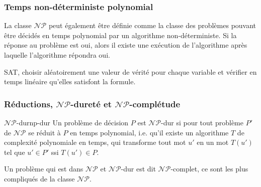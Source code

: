 \subsubsection{Temps non-déterministe polynomial}
\label{sub:temps_non_deterministe_polynomial}
La classe $\mathcal{NP}$ peut également être définie comme la classe des problèmes pouvant être décidés en temps polynomial
par un algorithme non-déterministe. Si la réponse au problème est oui, alors il existe une exécution de l'algorithme après 
laquelle l'algorithme répondra oui.
\begin{example}
    SAT, choisir aléatoirement une valeur de vérité pour chaque variable et vérifier en temps linéaire qu'elles satisfont
    la formule.
\end{example}

\subsubsection{Réductions, $\mathcal{NP}$-dureté et $\mathcal{NP}$-complétude}
\label{sub:reductions_np_durete_et_np_completude}
\begin{definition}{$\mathcal{NP}$-dur}{np-dur}
    Un problème de décision $P$ est $\mathcal{NP}$-dur si pour tout problème $P'$ de $\mathcal{NP}$ se réduit à $P$ en temps
    polynomial, i.e. qu'il existe un algorithme $T$ de complexité polynomiale en temps, qui transforme tout mot $u'$ en un 
    mot $T(u')$ tel que $u'\in P'$ ssi $T(u')\in P$.
\end{definition}
Un problème qui est dans $\mathcal{NP}$ et $\mathcal{NP}$-dur est dit $\mathcal{NP}$-complet, ce sont les plus compliqués de
la classe $\mathcal{NP}$.

